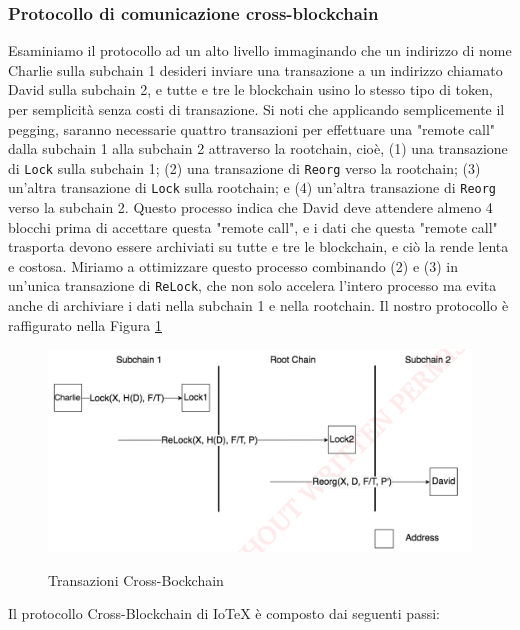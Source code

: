 \subsubsection{Protocollo di comunicazione cross-blockchain}
Esaminiamo il protocollo ad un alto livello immaginando che un indirizzo di nome Charlie sulla
subchain 1 desideri inviare una transazione a un indirizzo chiamato David sulla subchain 2, e tutte e tre le blockchain usino lo stesso tipo di token, per semplicità senza costi di transazione. Si noti che applicando semplicemente il pegging, saranno necessarie quattro transazioni per effettuare una "remote call" dalla subchain 1 alla subchain 2 attraverso la rootchain, cioè, (1) una transazione di \texttt{Lock} sulla subchain 1; (2) una transazione di \texttt{Reorg} verso la rootchain; (3) un'altra transazione di \texttt{Lock} sulla rootchain; e (4) un'altra transazione di \texttt{Reorg} verso la subchain 2.
Questo processo indica che David deve attendere almeno 4 blocchi prima di accettare questa "remote call", e i dati che questa "remote call" trasporta devono essere archiviati su tutte e tre le blockchain, e ciò la rende lenta e costosa. Miriamo a ottimizzare questo processo combinando (2)
e (3) in un'unica transazione di \texttt{ReLock}, che non solo accelera l'intero processo ma
evita anche di archiviare i dati nella subchain 1 e nella rootchain. Il nostro protocollo è raffigurato
nella Figura \ref{fig:fig2}

\begin{figure}[ht]
	\includegraphics[width=\textwidth]{Figura2.png}
	\label{fig:fig2}
	\caption{Transazioni Cross-Bockchain}
\end{figure}

Il protocollo Cross-Blockchain di IoTeX è composto dai seguenti passi:

